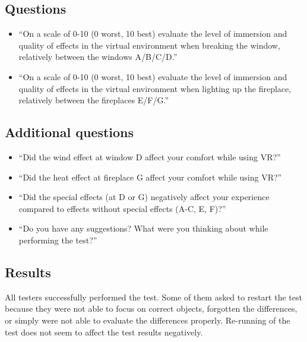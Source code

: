 \hypertarget{x-questions}{\subsection{Questions}}
\begin{itemize}
    \itemsep0em

\item ``On a scale of 0-10 (0 worst, 10 best) evaluate the level of immersion and quality
of effects in the virtual environment when breaking the window, relatively
between the windows A/B/C/D.''

\item ``On a scale of 0-10 (0 worst, 10 best) evaluate the level of immersion and quality
of effects in the virtual environment when lighting up the fireplace, relatively
between the fireplaces E/F/G.''

\end{itemize}


\hypertarget{x-additional-questions}{\subsection{Additional questions}}
\begin{itemize}
    \itemsep0em

\item ``Did the wind effect at window D affect your comfort while using VR?''

\item ``Did the heat effect at fireplace G affect your comfort while using VR?''

\item ``Did the special effects (at D or G) negatively affect your experience
compared to effects without special effects (A-C, E, F)?''

\item ``Do you have any suggestions? What were you thinking about while performing
the test?''

\end{itemize}


\hypertarget{x-results}{\subsection{Results}}
All testers successfully performed the test. Some of them asked to
restart the test because they were not able to focus on correct objects,
forgotten the differences, or simply were not able to evaluate the
differences properly. Re-running of the test does not seem to affect the
test results negatively.


